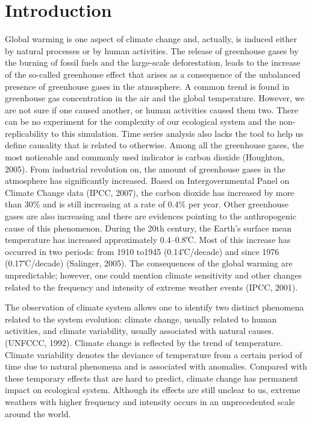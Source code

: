 \documentclass[a4paper,11pt]{article}
\begin{document}
\section{Introduction}
Global warming is one aspect of climate change and, actually, is induced either by natural processes or by human activities. The release of greenhouse gases by the burning of fossil fuels and the large-scale deforestation, leads to the increase of the so-called greenhouse effect that arises as a consequence of the unbalanced presence of greenhouse gases in the atmosphere. A common trend is found in greenhouse gas concentration in the air and the global temperature. However, we are not sure if one caused another, or human activities caused them two. There can be no experiment for the complexity of our ecological system and the non-replicability to this simulation. Time series analysis also lacks the tool to help us define causality that is related to otherwise.
Among all the greenhouse gases, the most noticeable and commonly used indicator is carbon dioxide (Houghton, 2005). From industrial revolution on, the amount of greenhouse gases in the atmosphere has significantly increased. Based on Intergovernmental Panel on Climate Change data (IPCC, 2007), the carbon dioxide has increased by more than 30\% and is still increasing at a rate of 0.4\% per year. Other greenhouse gases are also increasing and there are evidences pointing to the anthropogenic cause of this phenomenon. During the 20th century, the Earth’s surface mean temperature has increased approximately 0.4–0.8℃. Most of this increase has occurred in two periods: from 1910 to1945 (0.14℃/decade) and since 1976 (0.17℃/decade) (Salinger, 2005). The consequences of the global warming are unpredictable; however, one could mention climate sensitivity and other changes related to the frequency and intensity of extreme weather events (IPCC, 2001).\par
The observation of climate system allows one to identify two distinct phenomena related to the system evolution: climate change, usually related to human activities, and climate variability, usually associated with natural causes. (UNFCCC, 1992). Climate change is reflected by the trend of temperature. Climate variability denotes the deviance of temperature from a certain period of time due to natural phenomena and is associated with anomalies. Compared with these temporary effects that are hard to predict, climate change has permanent impact on ecological system. Although its effects are still unclear to us, extreme weathers with higher frequency and intensity occurs in an unprecedented scale around the world.\par
\end{document}
